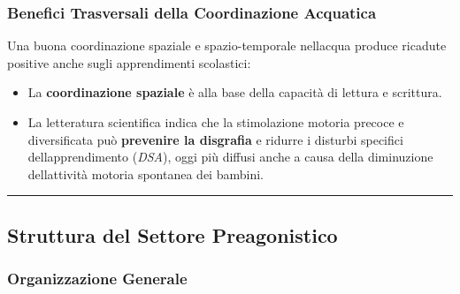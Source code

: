 \documentclass[a4paper,11pt]{article}
\providecommand{\tightlist}{%
  \setlength{\itemsep}{0pt}\setlength{\parskip}{0pt}}
\begin{document}
\subsubsection{Benefici Trasversali della Coordinazione
      Acquatica}\label{benefici-trasversali-della-coordinazione-acquatica}

Una buona coordinazione spaziale e spazio-temporale
nell\textquotesingle acqua produce ricadute positive anche sugli
apprendimenti scolastici:

\begin{itemize}
      \tightlist
      \item
            La \textbf{coordinazione spaziale} è alla base della capacità di
            lettura e scrittura.
      \item
            La letteratura scientifica indica che la stimolazione motoria precoce
            e diversificata può \textbf{prevenire la disgrafia} e ridurre i
            disturbi specifici dell\textquotesingle apprendimento (\emph{DSA}),
            oggi più diffusi anche a causa della diminuzione
            dell\textquotesingle attività motoria spontanea dei bambini.
\end{itemize}

\begin{center}\rule{0.5\linewidth}{0.5pt}\end{center}

\subsection{Struttura del Settore
      Preagonistico}\label{struttura-del-settore-preagonistico}

\subsubsection{Organizzazione Generale}\label{organizzazione-generale}
\end{document}
